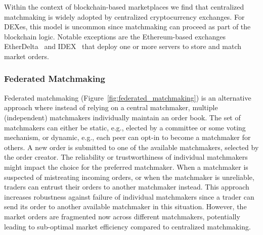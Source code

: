 Within the context of blockchain-based marketplaces we find that centralized matchmaking is widely adopted by centralized cryptocurrency exchanges.
For DEXes, this model is uncommon since matchmaking can proceed as part of the blockchain logic.
Notable exceptions are the Ethereum-based exchanges EtherDelta~\cite{etherdelta} and IDEX~\cite{idex} that deploy one or more servers to store and match market orders.


\subsubsection{Federated Matchmaking}

Federated matchmaking (Figure~\ref{fig:federated_matchmaking}) is an alternative approach where instead of relying on a central matchmaker, multiple (independent) matchmakers individually maintain an order book.
The set of matchmakers can either be static, e.g., elected by a committee or some voting mechanism, or dynamic, e.g., each peer can opt-in to become a matchmaker for others.
A new order is submitted to one of the available matchmakers, selected by the order creator.
The reliability or trustworthiness of individual matchmakers might impact the choice for the preferred matchmaker.
When a matchmaker is suspected of mistreating incoming orders, or when the matchmaker is unreliable, traders can entrust their orders to another matchmaker instead.
This approach increases robustness against failure of individual matchmakers since a trader can send its order to another available matchmaker in this situation.
However, the market orders are fragmented now across different matchmakers, potentially leading to sub-optimal market efficiency compared to centralized matchmaking.

